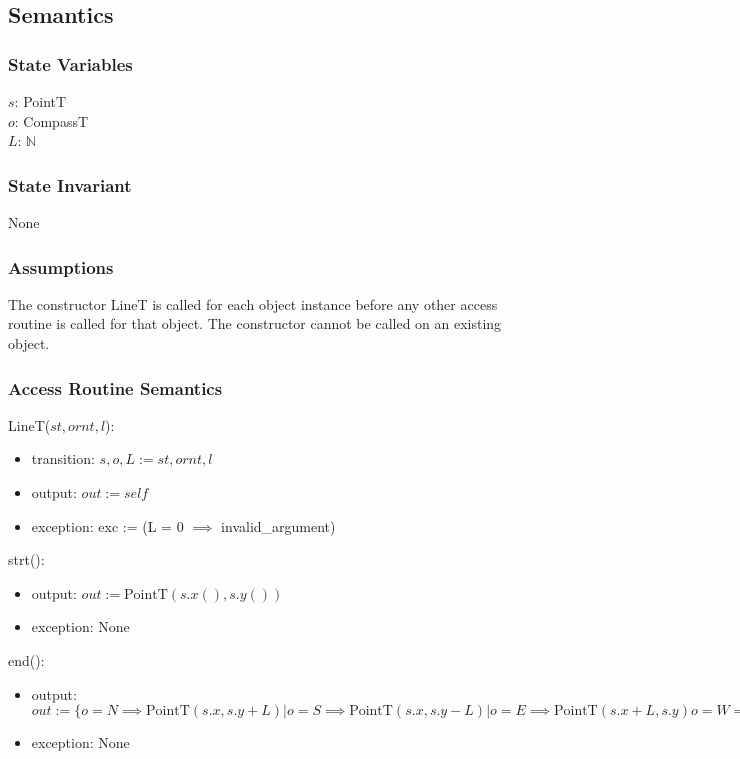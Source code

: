 \documentclass[12pt]{article}
\begin{document}
\subsection* {Semantics}

\subsubsection* {State Variables}

$s$: PointT\\
$o$: CompassT\\
$L$: $\mathbb{N}$\\ 

\subsubsection* {State Invariant}

None

\subsubsection* {Assumptions}

The constructor LineT is called for each object instance before any other
access routine is called for that object.  The constructor cannot be called on
an existing object.

\subsubsection* {Access Routine Semantics}

LineT($st, ornt, l$):
\begin{itemize}
\item transition: $s, o, L := st, ornt, l$
\item output: $out := \mathit{self}$
\item exception: exc := (L = 0 $\implies$ invalid\_argument)
\end{itemize}

\noindent strt():
\begin{itemize}
\item output: $out := \mbox{PointT}(s.x(), s.y())$
\item exception: None
\end{itemize}

\noindent end():
\begin{itemize}
\item output: $out := \{o = N \implies \mbox{PointT}(s.x, s.y + L) | o = S \implies \mbox{PointT}(s.x, s.y - L) | o = E \implies \mbox{PointT}(s.x + L, s.y) o = W \implies \mbox{PointT}(s.x - L, s.y)\}$

\item exception: None
\end{itemize}
\end{document}
